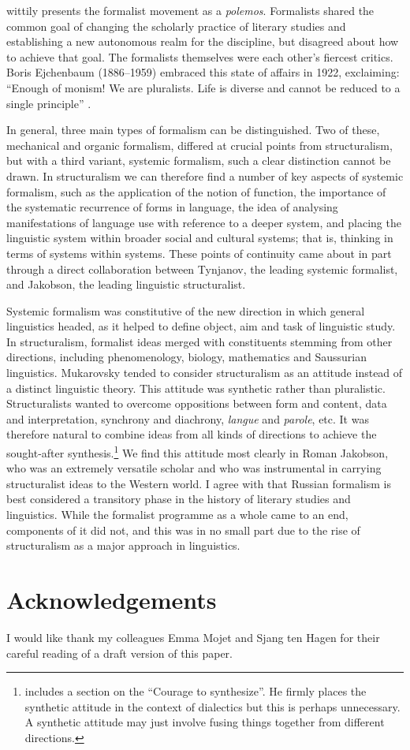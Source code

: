 \documentclass[output=paper]{langscibook}
\begin{document}
\citet{Steiner1984} wittily presents the formalist movement as a \emph{polemos}. Formalists shared the common goal of changing the scholarly practice of literary studies and establishing a new autonomous realm for the discipline, but disagreed about how to achieve that goal. The formalists themselves were each other's fiercest critics. Boris Ejchenbaum (1886--1959) embraced this state of affairs in 1922, exclaiming: ``Enough of monism! We are pluralists. Life is diverse and cannot be reduced to a single principle'' \citep[quoted in English in][259]{Steiner1984}.

In general, three main types of formalism can be distinguished. Two of these, mechanical and organic formalism, differed at crucial points from structuralism, but with a third variant, systemic formalism, such a clear distinction cannot be drawn. In structuralism we can therefore find a number of key aspects of systemic formalism, such as the application of the notion of function, the importance of the systematic recurrence of forms in language, the idea of analysing manifestations of language use with reference to a deeper system, and placing the linguistic system within broader social and cultural systems; that is, thinking in terms of systems within systems. These points of continuity came about in part through a direct collaboration between Tynjanov, the leading systemic formalist, and Jakobson, the leading linguistic structuralist.

Systemic formalism was constitutive of the new direction in which general linguistics headed, as it helped to define object, aim and task of linguistic study. In structuralism, formalist ideas merged with constituents stemming from other directions, including phenomenology, biology, mathematics and Saussurian linguistics. Mukarovsky tended to consider structuralism as an attitude instead of a distinct linguistic theory. This attitude was synthetic rather than pluralistic. Structuralists wanted to overcome oppositions between form and content, data and interpretation, synchrony and diachrony, \emph{langue} and \emph{parole}, etc. It was therefore natural to combine ideas from all kinds of directions to achieve the sought-after synthesis.\footnote{\citet[150--152]{Toman1995} includes a section on the ``Courage to synthesize''. He firmly places the synthetic attitude in the context of dialectics but this is perhaps unnecessary. A synthetic attitude may just involve fusing things together from different directions.} We find this attitude most clearly in Roman Jakobson, who was an extremely versatile scholar and who was instrumental in carrying structuralist ideas to the Western world. I agree with \citet{Steiner1984} that Russian formalism is best considered a transitory phase in the history of literary studies and linguistics. While the formalist programme as a whole came to an end, components of it did not, and this was in no small part due to the rise of structuralism as a major approach in linguistics. 

\section*{Acknowledgements}

I would like thank my colleagues Emma Mojet and Sjang ten Hagen for their careful reading of a draft version of this paper.

\sloppy
\printbibliography[heading=subbibliography,notkeyword=this] 
\end{document}
